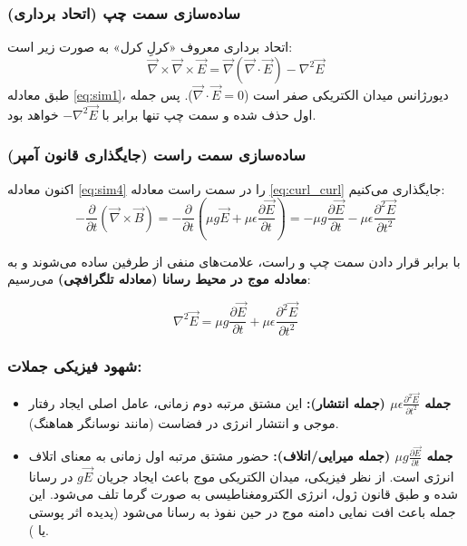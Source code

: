 \documentclass[12pt,a4paper]{article}
\begin{document}
\subsubsection*{ساده‌سازی سمت چپ (اتحاد برداری)}
اتحاد برداری معروف «کرلِ کرل» به صورت زیر است:
\begin{equation*}
	\vec{\nabla} \times \vec{\nabla} \times \vec{E} = \vec{\nabla}(\vec{\nabla} \cdot \vec{E}) - \nabla^2\vec{E}
\end{equation*}
طبق معادله \eqref{eq:sim1}، دیورژانس میدان الکتریکی صفر است ($\vec{\nabla} \cdot \vec{E} = 0$). پس جمله اول حذف شده و سمت چپ تنها برابر با $-\nabla^2\vec{E}$ خواهد بود.

\subsubsection*{ساده‌سازی سمت راست (جایگذاری قانون آمپر)}
اکنون معادله \eqref{eq:sim4} را در سمت راست معادله \eqref{eq:curl_curl} جایگذاری می‌کنیم:
\begin{equation*}
	-\frac{\partial}{\partial t} (\vec{\nabla} \times \vec{B}) = -\frac{\partial}{\partial t} \left( \mu g \vec{E} + \mu \epsilon \frac{\partial \vec{E}}{\partial t} \right) = -\mu g \frac{\partial \vec{E}}{\partial t} - \mu \epsilon \frac{\partial^2 \vec{E}}{\partial t^2}
\end{equation*}

با برابر قرار دادن سمت چپ و راست، علامت‌های منفی از طرفین ساده می‌شوند و به \textbf{معادله موج در محیط رسانا (معادله تلگرافچی)} می‌رسیم:

\begin{tcolorbox}[colback=blue!5,colframe=blue!50!black,title=معادله دیفرانسیل موج الکترومغناطیسی]
\begin{equation} \label{eq:telegraph}
	\nabla^2 \vec{E} = \mu g \frac{\partial \vec{E}}{\partial t} + \mu \epsilon \frac{\partial^2 \vec{E}}{\partial t^2}
\end{equation}
\end{tcolorbox}

\subsubsection*{شهود فیزیکی جملات:}
\begin{itemize}
	\item \textbf{جمله $\mu \epsilon \frac{\partial^2 \vec{E}}{\partial t^2}$ (جمله انتشار):} این مشتق مرتبه دوم زمانی، عامل اصلی ایجاد رفتار موجی و انتشار انرژی در فضاست (مانند نوسانگر هماهنگ).
	\item \textbf{جمله $\mu g \frac{\partial \vec{E}}{\partial t}$ (جمله میرایی/اتلاف):} حضور مشتق مرتبه اول زمانی به معنای اتلاف انرژی است. از نظر فیزیکی، میدان الکتریکی موج باعث ایجاد جریان $g\vec{E}$ در رسانا شده و طبق قانون ژول، انرژی الکترومغناطیسی به صورت گرما تلف می‌شود. این جمله باعث افت نمایی دامنه موج در حین نفوذ به رسانا می‌شود (پدیده اثر پوستی یا ).
\end{itemize}
\end{document}
